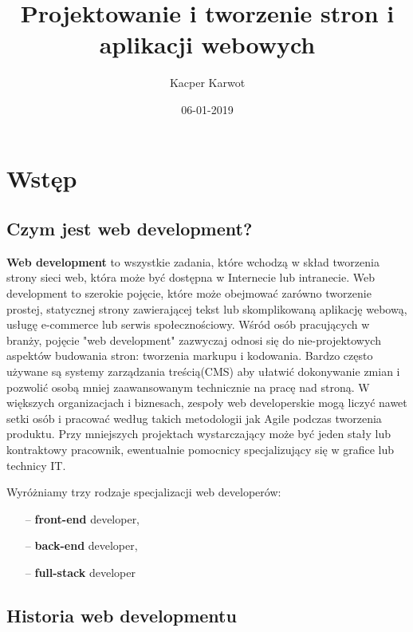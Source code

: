 \documentclass[12pt]{report}
\title{Projektowanie i tworzenie stron i aplikacji webowych}
\date{06-01-2019}
\author{Kacper Karwot}
\begin{document}
	\maketitle
	\tableofcontents
	\newpage
	\chapter{Wstęp}
	\section{Czym jest web development?}
	\textbf{Web development} to wszystkie zadania, które wchodzą w skład tworzenia strony sieci web, która może być dostępna w Internecie lub intranecie. 
	Web development to szerokie pojęcie, które może obejmować zarówno tworzenie prostej, statycznej strony zawierającej tekst lub 			skomplikowaną aplikację webową, usługę e-commerce lub serwis społecznościowy. 
 Wśród osób pracujących w branży, pojęcie "web development" zazwyczaj odnosi się do nie-projektowych aspektów budowania stron: tworzenia markupu i kodowania. Bardzo często używane są systemy zarządzania treścią(CMS) aby ułatwić dokonywanie zmian i pozwolić osobą mniej zaawansowanym technicznie na pracę nad stroną.
 	\newline
 	W większych organizacjach i biznesach, zespoły web developerskie mogą liczyć nawet setki osób i pracować według takich metodologii jak Agile podczas tworzenia produktu. Przy mniejszych projektach wystarczający może być jeden stały lub kontraktowy pracownik, ewentualnie pomocnicy specjalizujący się w grafice lub technicy IT. 
	\newline
	\begin{center}
	Wyróżniamy trzy rodzaje specjalizacji web developerów:
	
	\begin{itemize}
	\item[--] \textbf{front-end} developer,
	\item[--] \textbf{back-end} developer,
	\item[--] \textbf{full-stack} developer
 	\end{itemize}
 	\end{center}
 	
 	\cite{wiki:1}
 	
 	\newpage
	\section{Historia web developmentu}
	
\end{document}
